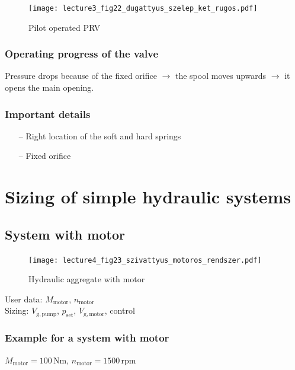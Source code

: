 \begin{figure}
\begin{center}
\texttt{[image: lecture3\_fig22\_dugattyus\_szelep\_ket\_rugos.pdf]}
\caption{\label{fig:pilot_operated_PRV}Pilot operated PRV}
\end{center}
\end{figure}

\subsubsection{Operating progress of the valve}
Pressure drops because of the fixed orifice $\rightarrow$ the spool moves upwards $\rightarrow$ it opens the main opening.
\subsubsection{Important details}
\begin{itemize}
\item[--] Right location of the soft and hard springs
\item[--] Fixed orifice
\end{itemize}
\section{Sizing of simple hydraulic systems}

\clearpage

\subsection{System with motor}

\begin{figure}[tbh]
\begin{center}
\texttt{[image: lecture4\_fig23\_szivattyus\_motoros\_rendszer.pdf]}
\caption{\label{fig:hydraulic_aggregate_with_motor}Hydraulic aggregate with motor}
\end{center}
\end{figure}

User data: $M_{\mathrm{motor}}$, $n_{\mathrm{motor}}$\\
Sizing: $V_{\mathrm{g,pump}}$, $p_{\mathrm{set}}$, $V_{\mathrm{g,motor}}$, control
\subsubsection{Example for a system with motor}
$M_{\mathrm{motor}}=100\,\mathrm{Nm}$, $n_{\mathrm{motor}}=1500\,\mathrm{rpm}$
